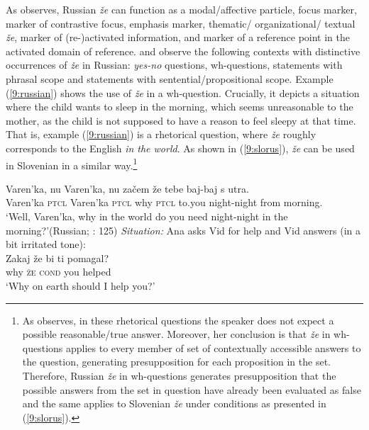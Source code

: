 \documentclass[output=paper,modfonts,newtxmath,hidelinks]{langscibook}
\begin{document}
\noindent As \cite{mccoy2003} observes, Russian \textit{že} can function as a modal/affective particle, focus marker, marker of contrastive focus, emphasis marker, thematic/ organizational/ textual \textit{že}, marker of (re-)activated information, and marker of a reference point in the activated domain of reference. \citet{hagstrommccoy2003} and \cite{mccoy2003} observe the following contexts with distinctive occurrences of \textit{že} in Russian: \textit{yes-no} questions, wh-questions, statements with phrasal scope and statements with sentential/propositional scope. Example (\ref{9:russian}) shows the use of \textit{že} in a wh-question. Crucially, it depicts a situation where the child wants to sleep in the morning, which seems unreasonable to the mother, as the child is not supposed to have a reason to feel sleepy at that time. That is, example (\ref{9:russian}) is a rhetorical question, where \textit{že} roughly corresponds to the English \textit{in the world}. As shown in (\ref{9:slorus}), \textit{že} can be used in Slovenian in a similar way.\footnote{As \cite{mccoy2003} observes, in these rhetorical questions the speaker does not expect a possible reasonable/true answer. Moreover, her conclusion is that \textit{že} in wh-questions applies to every member of set of contextually accessible answers to the question, generating presupposition for each proposition in the set. Therefore, Russian \textit{že} in wh-questions generates presupposition that the possible answers from the set in question have already been evaluated as false and the same applies to Slovenian \textit{že} under conditions as presented in (\ref{9:slorus}).}

\begin{exe}
\ex\gll Varen'ka, nu Varen'ka, nu začem že tebe baj-baj s utra. \\
Varen'ka \textsc{ptcl} Varen'ka \textsc{ptcl} why \textsc{ptcl} to.you night-night from morning.\\
\glt `Well, Varen'ka, why in the world do you need night-night in the morning?'\hfill(Russian; \citealt{mccoy2003}: 125) \label{9:russian}
\ex \textit{Situation:} Ana asks Vid for help and Vid answers (in a bit irritated tone): \label{9:slorus} \\
\gll Zakaj že bi ti pomagal? \\
	why \textsc{že}  \textsc{cond} you helped \\
\trans `Why on earth should I help you?'
\end{exe}
\end{document}
